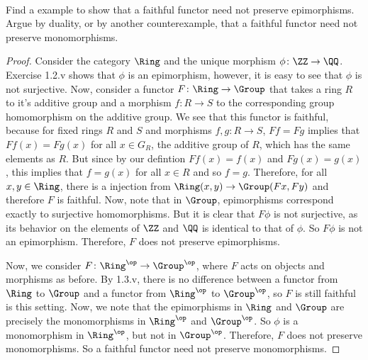 \documentclass[main.tex]{subfiles}
\begin{document}
\paragraph{}
\begin{exercise}
	Find a example to show that a faithful functor need not preserve
	epimorphisms. Argue by duality, or by another counterexample, that a
	faithful functor need not preserve monomorphisms.
\end{exercise}
\begin{proof}
	Consider the category $\Ring$ and the unique morphism $\phi\colon \ZZ \rightarrow
	\QQ$. Exercise 1.2.v shows that $\phi$ is an epimorphism, however, it is
	easy to see that $\phi$ is not surjective. Now, consider a functor $F\colon \Ring
	\rightarrow \Group$ that takes a ring $R$ to it's additive group and a
	morphism $f\colon R \rightarrow S$ to the corresponding group homomorphism on the
	additive group. We see that this functor is faithful, because for fixed
	rings $R$ and $S$ and morphisms $f,g \colon R \rightarrow S$, $Ff = Fg$ implies
	that $Ff(x) = Fg(x)$ for all $x \in G_R$, the additive group of $R$, which
	has the same elements as $R$. But since by our defintion $Ff(x) = f(x)$ and
	$Fg(x) = g(x)$, this implies that $f = g(x)$ for all $x \in R$ and so $f =
	g$. Therefore, for all $x,y \in \Ring$, there is a injection from
	$\Ring(x,y) \rightarrow \Group (Fx,Fy)$ and therefore $F$ is faithful.  Now,
	note that in $\Group$, epimorphisms correspond exactly to surjective
	homomorphisms. But it is clear that $F\phi$ is not surjective, as its
	behavior on the elements of $\ZZ$ and $\QQ$ is identical to that of $\phi$.
	So $F\phi$ is not an epimorphism. Therefore, $F$ does not preserve
	epimorphisms.

	Now, we consider $F\colon \Ring^{\op} \rightarrow \Group^{\op}$, where $F$ acts on
	objects and morphisms as before. By 1.3.v, there is no difference between a
	functor from $\Ring$ to $\Group$ and a functor from $\Ring^{\op}$ to
	$\Group^{\op}$, so $F$ is still faithful is this setting. Now, we note that
	the epimorphisms in $\Ring$ and $\Group$ are precisely the monomorphisms in
	$\Ring^{\op}$ and $\Group^{\op}$. So $\phi$ is a monomorphism in $\Ring^{\op}$,
	but not in $\Group^{\op}$. Therefore, $F$ does not preserve monomorphisms. So
	a faithful functor need not preserve monomorphisms.
\end{proof}
\end{document}
